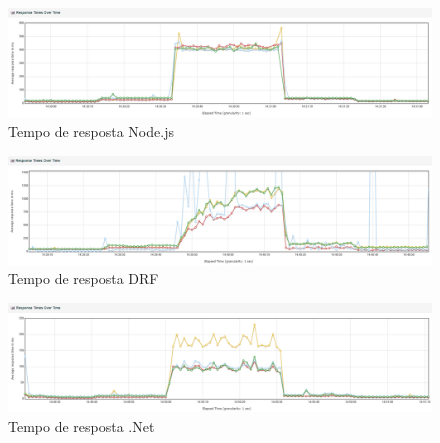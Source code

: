 \documentclass{libs/ufc_format}
\begin{document}
\begin{frame}{}
    \begin{figure}[H]
        \centering
        \caption{Tempo de resposta Node.js}
        \includegraphics[width=1\linewidth]{figuras/tempo-resposta-pico-nodejs.png}
        \captionsetup{justification=centering}
    \end{figure}
\end{frame}

\begin{frame}{}
    \begin{figure}[H]
        \centering
        \caption{Tempo de resposta DRF}
        \includegraphics[width=1\linewidth]{figuras/tempo-resposta-pico-drf.png}
        \captionsetup{justification=centering}
    \end{figure}
\end{frame}

\begin{frame}{}
    \begin{figure}[H]
        \centering
        \caption{Tempo de resposta .Net}
        \includegraphics[width=1\linewidth]{figuras/tempo-resposta-pico-dotnet.png}
        \captionsetup{justification=centering}
    \end{figure}
\end{frame}
\end{document}
